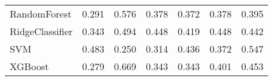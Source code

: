 \begin{tabular}{lllllll}
                   RandomForest & 0.291 &                     0.576 &                 0.378 &                  0.372 &                                   0.378 &    0.395 \\
                RidgeClassifier & 0.343 &                     0.494 &                 0.448 &                  0.419 &                                   0.448 &    0.442 \\
                            SVM & 0.483 &                     0.250 &                 0.314 &                  0.436 &                                   0.372 &    0.547 \\
                        XGBoost & 0.279 &                     0.669 &                 0.343 &                  0.343 &                                   0.401 &    0.453 \\
\bottomrule
\end{tabular}
